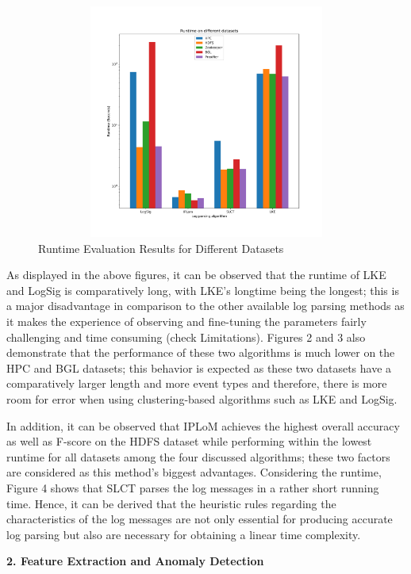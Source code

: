 \documentclass[12pt,a4paper]{article}
\begin{document}
	\begin{figure}[H]
		\centering
		\includegraphics[width=13cm, height=7.7cm]{Figures/Runtime_1}
		\vspace{-0.8cm}
		
		\caption{Runtime Evaluation Results for Different Datasets}
	\end{figure}


	\noindent As displayed in the above figures, it can be observed that the runtime of LKE and LogSig is comparatively long, with LKE's longtime being the longest; this is a major disadvantage in comparison to the other available log parsing methods as it makes the experience of observing and fine-tuning the parameters fairly challenging and time consuming (check Limitations). Figures 2 and 3 also demonstrate that the performance of these two algorithms is much lower on the HPC and BGL datasets; this behavior is expected as these two datasets have a comparatively larger length and more event types and therefore, there is more room for error when using clustering-based algorithms such as LKE and LogSig.
	
	
	\noindent In addition, it can be observed that IPLoM achieves the highest overall accuracy as well as F-score on the HDFS dataset while performing within the lowest runtime for all datasets among the four discussed algorithms; these two factors are considered as this method's biggest advantages. Considering the runtime, Figure 4 shows that SLCT parses the log messages in a rather short running time. Hence, it can be derived that the heuristic rules regarding the characteristics of the log messages are not only essential for producing accurate log parsing but also are necessary for obtaining a linear time complexity. 
	
	\vspace{0.4cm}
	\noindent \textbf{\large 2. Feature Extraction and Anomaly Detection}
	\vspace{0.3cm}
\end{document}
